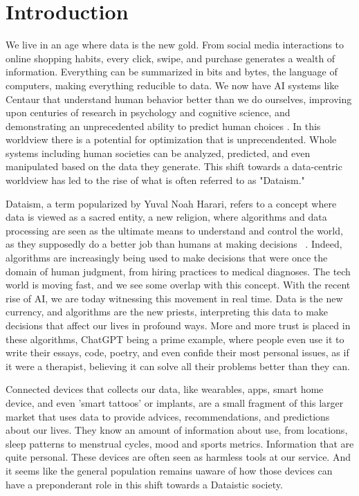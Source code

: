 
\section{Introduction}
We live in an age where data is the new gold. From social media interactions to online shopping habits, every click, swipe, and purchase generates a wealth of information. Everything can be summarized in bits and bytes, the language of computers, making everything reducible to data. We now have AI systems like Centaur that understand human behavior better than we do ourselves, improving upon centuries of research in psychology and cognitive science, and demonstrating an unprecedented ability to predict human choices \cite{Binz2025}. In this worldview there is a potential for optimization that is unprecendented. Whole systems including human societies can be analyzed, predicted, and even manipulated based on the data they generate. This shift towards a data-centric worldview has led to the rise of what is often referred to as "Dataism."

Dataism, a term popularized by Yuval Noah Harari, refers to a concept where data is viewed as a sacred entity, a new religion, where algorithms and data processing are seen as the ultimate means to understand and control the world, as they supposedly do a better job than humans at making decisions ~\cite{Harari2017}. Indeed, algorithms are increasingly being used to make decisions that were once the domain of human judgment, from hiring practices to medical diagnoses. The tech world is moving fast, and we see some overlap with this concept. With the recent rise of AI, we are today witnessing this movement in real time. Data is the new currency, and algorithms are the new priests, interpreting this data to make decisions that affect our lives in profound ways. More and more trust is placed in these algorithms, ChatGPT being a prime example, where people even use it to write their essays, code, poetry, and even confide their most personal issues, as if it were a therapist, believing it can solve all their problems better than they can.

Connected devices that collects our data, like wearables, apps, smart home device, and even 'smart tattoos' or implants, are a small fragment of this larger market that uses data to provide advices, recommendations, and predictions about our lives. They know an amount of information about use, from locations, sleep patterns to menstrual cycles, mood and sports metrics. Information that are quite personal. These devices are often seen as harmless tools at our service. And it seems like the general population remains uaware of how those devices can have a preponderant role in this shift towards a Dataistic society.

